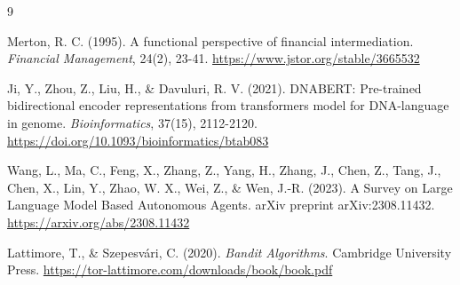 \documentclass[11pt,a4paper]{article}
\begin{document}
{\small
\begin{thebibliography}{9}

Merton, R. C. (1995).
A functional perspective of financial intermediation.
\textit{Financial Management}, 24(2), 23-41.
\url{https://www.jstor.org/stable/3665532}

Ji, Y., Zhou, Z., Liu, H., \& Davuluri, R. V. (2021).
DNABERT: Pre-trained bidirectional encoder representations from transformers model for DNA-language in genome.
\textit{Bioinformatics}, 37(15), 2112-2120.
\url{https://doi.org/10.1093/bioinformatics/btab083}

Wang, L., Ma, C., Feng, X., Zhang, Z., Yang, H., Zhang, J., Chen, Z., Tang, J., Chen, X., Lin, Y., Zhao, W. X., Wei, Z., \& Wen, J.-R. (2023).
A Survey on Large Language Model Based Autonomous Agents.
arXiv preprint arXiv:2308.11432.
\url{https://arxiv.org/abs/2308.11432}

Lattimore, T., \& Szepesvári, C. (2020).
\textit{Bandit Algorithms}.
Cambridge University Press.
\url{https://tor-lattimore.com/downloads/book/book.pdf}

\end{thebibliography}
}
\end{document}
